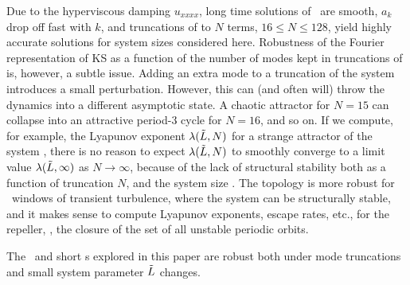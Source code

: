 Due to the hyperviscous damping $u_{xxxx}$, long time solutions of
\KSe\ are smooth, $a_k$ drop off fast with $k$,
and truncations of  to $N$ terms, $16 \leq N \leq 128$,
yield highly accurate solutions for system sizes considered here.
Robustness of the Fourier representation of KS as a function of the
number of modes kept in truncations of  is, however,
a subtle issue.  Adding an extra mode to a truncation of the system
introduces a small perturbation.
However, this can (and often will) throw the dynamics
into a different asymptotic state.
A chaotic attractor for $N=15$ can
collapse into an attractive period-3 cycle for $N=16$, and so on.
If
we compute, for example, the Lyapunov exponent $\lambda(\tilde{L},N)$ for
a strange attractor of the system , there is no reason to
expect $\lambda(\tilde{L},N)$ to smoothly converge to a limit value
$\lambda(\tilde{L},\infty)$ as $N \rightarrow \infty$, because of the lack
of structural stability both as a function of truncation $N$, and the
system size \tildeL.
The topology is more robust for \tildeL\ windows
of transient turbulence, where the system can be structurally stable,
and it makes sense to compute Lyapunov exponents, escape rates, etc.,
for the {repeller}, \ie, the closure of the set of all {unstable}
periodic orbits.

The \eqva\ and short \po s explored in this paper
are robust both under mode truncations and small
system parameter $\tilde{L}$ changes.


